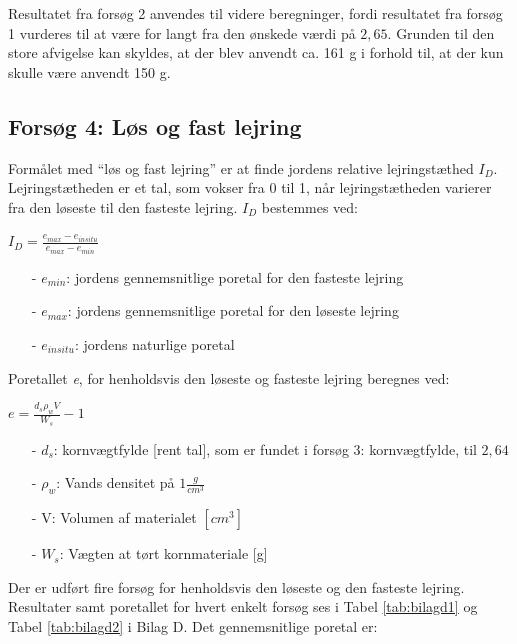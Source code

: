 Resultatet fra forsøg 2 anvendes til videre beregninger, fordi resultatet fra forsøg 1 vurderes til at være for langt fra den ønskede værdi på $2,\!65$. Grunden til den store afvigelse kan skyldes, at der blev anvendt ca. 161 g i forhold til, at der kun skulle være anvendt 150 g.

\subsection{Forsøg 4: Løs og fast lejring}
Formålet med “løs og fast lejring” er at finde jordens relative lejringstæthed $I_D$. Lejringstætheden er et tal, som vokser fra 0 til 1, når lejringstætheden varierer fra den løseste til den fasteste lejring.
\newline
\newline
$I_D$ bestemmes ved:

\begin{center}
	$I_D = \frac{e_{max} - e_{in situ}}{e_{max} - e_{min}}$
\end{center}

\begin{itemize}
	\item[-] $e_{min}$: jordens gennemsnitlige poretal for den fasteste lejring 
	\item[-] $e_{max}$: jordens gennemsnitlige poretal for den løseste lejring
	\item[-] $e_{in situ}$: jordens naturlige poretal 
\end{itemize}

Poretallet \textit{e}, for henholdsvis den løseste og fasteste lejring beregnes ved:

\begin{center}
	$e = \frac{d_s \rho_w  V}{W_s} - 1$
\end{center}

\begin{itemize}
	\item[-] $d_s$: kornvægtfylde [rent tal], som er fundet i forsøg 3: kornvægtfylde, til $2,\!64$ 
	\item[-] $\rho_w$: Vands densitet på $1 \frac{g}{cm^3}$
	\item[-] V: Volumen af materialet $[cm^3]$
	\item[-] $W_s$: Vægten at tørt kornmateriale [g]
\end{itemize}
 
Der er udført fire forsøg for henholdsvis den løseste og den fasteste lejring. Resultater samt poretallet for hvert enkelt forsøg ses i Tabel \ref{tab:bilagd1} og Tabel \ref{tab:bilagd2} i Bilag D.
Det gennemsnitlige poretal er:

